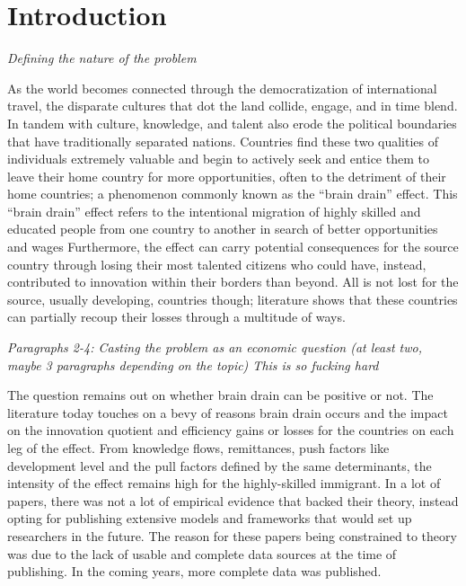 \documentclass[12pt]{article}
\newcommand{\pointer}[1]{{\color{red} \center \textit{#1}}}
\begin{document}
\section{Introduction}
\pointer{Defining the nature of the problem}

As the world becomes connected through the democratization of international travel, the disparate cultures that dot the land collide, engage, and in time blend.
In tandem with culture, knowledge, and talent also erode the political boundaries that have traditionally separated nations.
Countries find these two qualities of individuals extremely valuable and begin to actively seek and entice them to leave their home country for more opportunities, often to the detriment of their home countries; a phenomenon commonly known as the “brain drain” effect.
This “brain drain” effect refers to the intentional migration of highly skilled and educated people from one country to another in search of better opportunities and wages
Furthermore, the effect can carry potential consequences for the source country through losing their most talented citizens who could have, instead, contributed to innovation within their borders than beyond.
All is not lost for the source, usually developing, countries though; literature shows that these countries can partially recoup their losses through a multitude of ways.

\pointer{Paragraphs 2-4: Casting the problem as an economic question (at least two, maybe 3 paragraphs depending on the topic) This is so fucking hard}

The question remains out on whether brain drain can be positive or not.
The literature today touches on a bevy of reasons brain drain occurs and the impact on the innovation quotient and efficiency gains or losses for the countries on each leg of the effect.
From knowledge flows, remittances, push factors like development level and the pull factors defined by the same determinants, the intensity of the effect remains high for the highly-skilled immigrant.
In a lot of papers, there was not a lot of empirical evidence that backed their theory, instead opting for publishing extensive models and frameworks that would set up researchers in the future.
The reason for these papers being constrained to theory was due to the lack of usable and complete data sources at the time of publishing.
In the coming years, more complete data was published.
\end{document}
